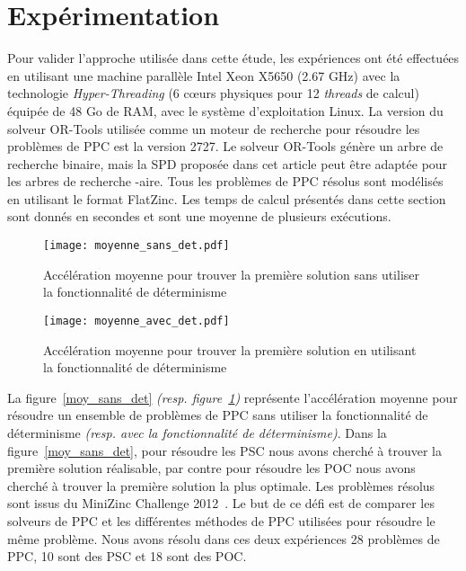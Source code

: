\documentclass[parallelisme]{compas2014}
\begin{document}
\section{Expérimentation}\label{xp}
Pour valider l'approche utilisée dans cette étude, les expériences ont été effectuées en utilisant une machine parallèle Intel Xeon X5650 (2.67 GHz) avec la technologie \textit{Hyper-Threading} (6 cœurs physiques pour 12 \textit{threads} de calcul) équipée de 48 Go de RAM, avec le système d'exploitation Linux. La version du solveur OR-Tools utilisée comme un moteur de recherche pour résoudre les problèmes de PPC est la version 2727. Le solveur OR-Tools génère un arbre de recherche binaire, mais la SPD proposée dans cet article peut être adaptée pour les arbres de recherche -aire. Tous les problèmes de PPC résolus sont modélisés en utilisant le format FlatZinc. Les temps de calcul présentés dans cette section sont donnés en secondes et sont une moyenne de plusieurs exécutions.


\begin{figure}[htbp]
\begin{minipage}[c]{.45\linewidth}
\texttt{[image: moyenne\_sans\_det.pdf]}
\caption {Accélération moyenne pour trouver la première solution sans utiliser la fonctionnalité de déterminisme} \label{moy_sans_det}
\end{minipage}
\hfill
\begin{minipage}[c]{.45\linewidth}
\texttt{[image: moyenne\_avec\_det.pdf]}
\caption {Accélération moyenne pour trouver la première solution en utilisant la fonctionnalité de déterminisme} \label{moy_avec_det}
\end{minipage}
\end{figure}

La figure~\ref{moy_sans_det} \textit{(resp. figure~\ref{moy_avec_det})} représente l'accélération moyenne pour résoudre un ensemble de problèmes de PPC sans utiliser la fonctionnalité de déterminisme \textit{(resp. avec la fonctionnalité de déterminisme)}. Dans la figure~\ref{moy_sans_det}, pour résoudre les PSC nous avons cherché à trouver la première solution réalisable, par contre pour résoudre les POC nous avons cherché à trouver la première solution la plus optimale. Les problèmes résolus sont issus du MiniZinc Challenge 2012~\cite{ch2012}. Le but de ce défi est de comparer les solveurs de PPC et les différentes méthodes de PPC utilisées pour résoudre le même problème. Nous avons résolu dans ces deux expériences 28 problèmes de PPC, 10 sont des PSC et 18 sont des POC.
\end{document}
